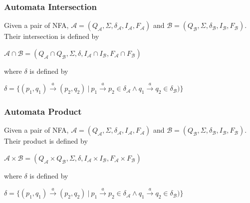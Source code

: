     \subsubsection{Automata Intersection}
    \label{defAInter}
      Given a pair of NFA, $\mathcal{A}=(Q_\mathcal{A},\Sigma,\delta_\mathcal{A},I_\mathcal{A},F_\mathcal{A})$ 
      and $\mathcal{B}=(Q_\mathcal{B},\Sigma,\delta_\mathcal{B},I_\mathcal{B},F_\mathcal{B})$. Their intersection is defined by
      \begin{description}
        \item $\mathcal{A} \cap \mathcal{B}=(Q_\mathcal{A}\cap Q_\mathcal{B},\Sigma,\delta,I_\mathcal{A}\cap I_\mathcal{B},F_\mathcal{A}\cap F_\mathcal{B})$\
      \end{description}
      where $\delta$ is defined by
      \begin{description}
        \item $\delta = 
        \{(p_1,q_1) \xrightarrow{a} (p_2,q_2)\ |\ p_1 \xrightarrow{a} p_2 \in \delta_\mathcal{A} \wedge q_1 \xrightarrow{a} q_2 \in \delta_\mathcal{B})\}$\
      \end{description}

      \subsubsection{Automata Product}
      \label{defAutProd}
      Given a pair of NFA, $\mathcal{A}=(Q_\mathcal{A},\Sigma,\delta_\mathcal{A},I_\mathcal{A},F_\mathcal{A})$ 
      and $\mathcal{B}=(Q_\mathcal{B},\Sigma,\delta_\mathcal{B},I_\mathcal{B},F_\mathcal{B})$. Their product is defined by
      \begin{description}
        \item $\mathcal{A} \times \mathcal{B}=
          (Q_\mathcal{A}\times Q_\mathcal{B},\Sigma,\delta,I_\mathcal{A}\times I_\mathcal{B},F_\mathcal{A}\times F_\mathcal{B})$\
      \end{description}
      where $\delta$ is defined by
      \begin{description}
        \item $\delta = 
        \{(p_1,q_1) \xrightarrow{a} (p_2,q_2)\ |\ p_1 \xrightarrow{a} p_2 \in \delta_\mathcal{A} \wedge q_1 \xrightarrow{a} q_2 \in \delta_\mathcal{B})\}$\
      \end{description}

